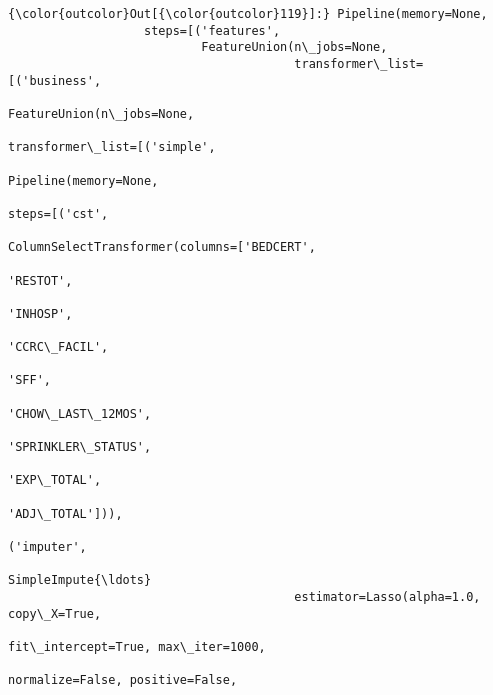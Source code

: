 \documentclass[11pt]{article}
\begin{document}
\begin{Verbatim}[commandchars=\\\{\}]
{\color{outcolor}Out[{\color{outcolor}119}]:} Pipeline(memory=None,
                   steps=[('features',
                           FeatureUnion(n\_jobs=None,
                                        transformer\_list=[('business',
                                                           FeatureUnion(n\_jobs=None,
                                                                        transformer\_list=[('simple',
                                                                                           Pipeline(memory=None,
                                                                                                    steps=[('cst',
                                                                                                            ColumnSelectTransformer(columns=['BEDCERT',
                                                                                                                                             'RESTOT',
                                                                                                                                             'INHOSP',
                                                                                                                                             'CCRC\_FACIL',
                                                                                                                                             'SFF',
                                                                                                                                             'CHOW\_LAST\_12MOS',
                                                                                                                                             'SPRINKLER\_STATUS',
                                                                                                                                             'EXP\_TOTAL',
                                                                                                                                             'ADJ\_TOTAL'])),
                                                                                                           ('imputer',
                                                                                                            SimpleImpute{\ldots}
                                        estimator=Lasso(alpha=1.0, copy\_X=True,
                                                        fit\_intercept=True, max\_iter=1000,
                                                        normalize=False, positive=False,

\end{Verbatim}
\end{document}
